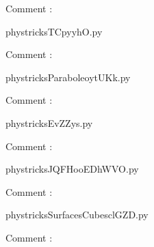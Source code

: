     Comment : 

    \clearpage
    


    \newcommand{\CaptionFigTCpyyhO}{<+Type your caption here+>}
    \begin{center}
        
    \end{center}
    phystricksTCpyyhO.py

    Comment : 

    \clearpage
    


    \newcommand{\CaptionFigParaboleoytUKk}{<+Type your caption here+>}
    \begin{center}
        
    \end{center}
    phystricksParaboleoytUKk.py

    Comment : 

    \clearpage
    


    \newcommand{\CaptionFigEvZZys}{<+Type your caption here+>}
    \begin{center}
        
    \end{center}
    phystricksEvZZys.py

    Comment : 

    \clearpage
    


    \newcommand{\CaptionFigJQFHooEDhWVO}{<+Type your caption here+>}
    \begin{center}
        
    \end{center}
    phystricksJQFHooEDhWVO.py

    Comment : 

    \clearpage
    


    \newcommand{\CaptionFigSurfacesCubesclGZD}{<+Type your caption here+>}
    \begin{center}
        
    \end{center}
    phystricksSurfacesCubesclGZD.py

    Comment : 

    \clearpage
    


